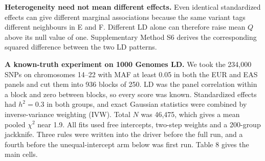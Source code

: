 \documentclass[11pt,a4paper]{article}
\begin{document}
\textbf{Heterogeneity need not mean different effects.} Even identical standardized effects can give different marginal associations because the same variant tags different neighbours in E and F. Different LD alone can therefore raise mean \(Q\) above its null value of one. Supplementary Method S6 derives the corresponding squared difference between the two LD patterns.

\textbf{A known-truth experiment on 1000 Genomes LD.} We took the 234,000 SNPs on chromosomes 14--22 with MAF at least 0.05 in both the EUR and EAS panels and cut them into 936 blocks of 250. LD was the panel correlation within a block and zero between blocks, so every score was known. Standardized effects had \(h^2=0.3\) in both groups, and exact Gaussian statistics were combined by inverse-variance weighting (IVW). Total \(N\) was 46,475, which gives a mean pooled \(\chi^2\) near 1.9. All fits used free intercepts, two-step weights and a 200-group jackknife. Three rules were written into the driver before the full run, and a fourth before the unequal-intercept arm below was first run. Table 8 gives the main cells.
\end{document}
